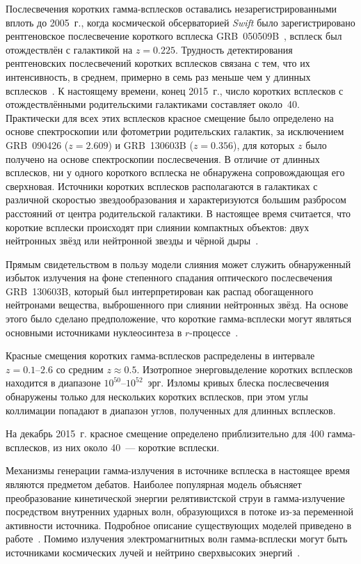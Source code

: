 Послесвечения коротких гамма-всплесков оставались незарегистрированными вплоть 
до 2005~г., когда космической обсерваторией \textit{Swift} было зарегистрировано 
рентгеновское послесвечение короткого всплеска GRB~050509B~\citep{Gehrels_2005Natur},
всплеск был отождествлён с галактикой на $z=0.225$. 
Трудность детектирования рентгеновских послесвечений коротких всплесков 
связана с тем, что их интенсивность, в среднем, примерно в семь раз меньше чем у 
длинных всплесков~\citep{Berger_2014ARAA}. 
К настоящему времени, конец 2015~г., число коротких всплесков с отождествлёнными 
родительскими галактиками составляет около~40. 
Практически для всех этих всплесков красное смещение было определено на основе 
спектроскопии или фотометрии родительских галактик, 
за исключением GRB~090426 ($z = 2.609$) и GRB~130603B ($z = 0.356$), 
для которых $z$ было получено на основе спектроскопии послесвечения.
В отличие от длинных всплесков, ни у одного короткого всплеска не обнаружена сопровождающая его сверхновая.
Источники коротких всплесков располагаются в галактиках с различной скоростью 
звездообразования и характеризуются большим разбросом расстояний от центра родительской галактики. 
В настоящее время считается, что короткие всплески происходят при слиянии компактных 
объектов: двух нейтронных звёзд или нейтронной звезды и чёрной дыры~\citep{Berger_2014ARAA}.

Прямым свидетельством в пользу модели слияния может служить обнаруженный избыток 
излучения на фоне степенного спадания оптического послесвечения GRB~130603B, 
который был интерпретирован как распад обогащенного нейтронами вещества, 
выброшенного при слиянии нейтронных звёзд. На основе этого было сделано предположение, 
что короткие гамма-всплески могут являться основными источниками нуклеосинтеза в 
$r$-процессе~\citep{Tanvir_2013Natur}.
 
Красные смещения коротких гамма-всплесков распределены в интервале $z=0.1\mbox{--}2.6$ 
со средним $z\approx 0.5$.
Изотропное энерговыделение коротких всплесков находится в диапазоне $10^{50}$--$10^{52}$~эрг.
Изломы кривых блеска послесвечения обнаружены только для нескольких коротких всплесков, 
при этом углы коллимации попадают в диапазон углов, полученных для длинных всплесков. 

На декабрь 2015~г. красное смещение определено приблизительно для 400 гамма-всплесков, 
из них около 40~--- короткие всплески. 

Механизмы генерации гамма-излучения в источнике всплеска в настоящее время 
являются предметом дебатов. Наиболее популярная модель объясняет преобразование 
кинетической энергии релятивистской струи в гамма-излучение посредством внутренних
ударных волн, образующихся в потоке из-за переменной активности источника.
Подробное описание существующих моделей приведено в работе~\citep{Kumar_and_Zhang_2014PhR}.
Помимо излучения электромагнитных волн гамма-всплески могут быть источниками
космических лучей и нейтрино сверхвысоких энергий~\citep{Aartsen_2015ApJ,Baerwald_2015APh}.

